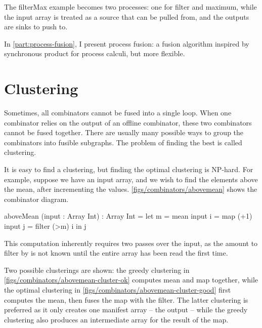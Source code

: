 The filterMax example becomes two processes: one for filter and maximum, while the input array is treated as a source that can be pulled from, and the outputs are sinks to push to.

In \autoref{part:process-fusion}, I present process fusion: a fusion algorithm inspired by synchronous product for process calculi, but more flexible.

\section{Clustering}
Sometimes, all combinators cannot be fused into a single loop.
When one combinator relies on the output of an offline combinator, these two combinators cannot be fused together.
There are usually many possible ways to group the combinators into fusible subgraphs.
The problem of finding the best is called clustering.

It is easy to find a clustering, but finding the optimal clustering is NP-hard.
For example, suppose we have an input array, and we wish to find the elements above the mean, after incrementing the values.
\autoref{figs/combinators/abovemean} shows the combinator diagram.

\begin{code}
aboveMean (input : Array Int) : Array Int
 = let m = mean         input
       i = map (+1)     input
       j = filter (>m)  i
   in  j
\end{code}


This computation inherently requires two passes over the input, as the amount to filter by is not known until the entire array has been read the first time.


Two possible clusterings are shown:
the greedy clustering in \autoref{figs/combinators/abovemean-cluster-ok} computes mean and map together, while the optimal clustering in \autoref{figs/combinators/abovemean-cluster-good} first computes the mean, then fuses the map with the filter.
The latter clustering is preferred as it only creates one manifest array -- the output -- while the greedy clustering also produces an intermediate array for the result of the map.

